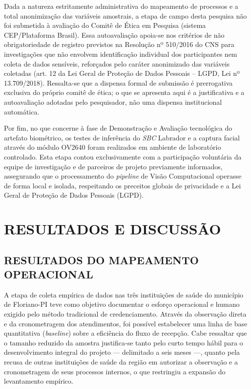 Dada a natureza estritamente administrativa do mapeamento de processos e a total anonimização das variáveis amostrais, a etapa de campo desta pesquisa não foi submetida à avaliação do Comitê de Ética em Pesquisa (sistema CEP/Plataforma Brasil). Essa autoavaliação apoia-se nos critérios de não obrigatoriedade de registro previstos na Resolução nº 510/2016 do CNS para investigações que não envolvem identificação individual dos participantes nem coleta de dados sensíveis, reforçados pelo caráter anonimizado das variáveis coletadas (art. 12 da Lei Geral de Proteção de Dados Pessoais -- LGPD, Lei nº 13.709/2018). Ressalta-se que a dispensa formal de submissão é prerrogativa exclusiva do próprio comitê de ética; o que se apresenta aqui é a justificativa e a autoavaliação adotadas pelo pesquisador, não uma dispensa institucional automática.

Por fim, no que concerne à fase de Demonstração e Avaliação tecnológica do artefato biométrico, os testes de inferência do \textit{SBC} Labrador e a captura facial através do módulo OV2640 foram realizados em ambiente de laboratório controlado. Esta etapa contou exclusivamente com a participação voluntária da equipe de investigação e de parceiros de projeto previamente informados, assegurando que o processamento do \textit{pipeline} de Visão Computacional operasse de forma local e isolada, respeitando os preceitos globais de privacidade e a Lei Geral de Proteção de Dados Pessoais (LGPD).



\section{RESULTADOS E DISCUSSÃO}
\label{sec:resultados}

\subsection{RESULTADOS DO MAPEAMENTO OPERACIONAL}
\label{resultados-mapeamento}

A etapa de coleta empírica de dados nas três instituições de saúde do município de Floriano-PI teve como objetivo documentar o esforço operacional e humano exigido pelo método tradicional de credenciamento. Através da observação direta e da cronometragem dos atendimentos, foi possível estabelecer uma linha de base quantitativa (\textit{baseline}) sobre a eficiência do fluxo de recepção. Cabe ressaltar que o tamanho reduzido da amostra justifica-se tanto pelo curto tempo hábil para o desenvolvimento integral do projeto — delimitado a seis meses —, quanto pela recusa de outras instituições de saúde da região em autorizar a observação e a cronometragem de seus processos internos, o que restringiu a expansão do levantamento empírico.

